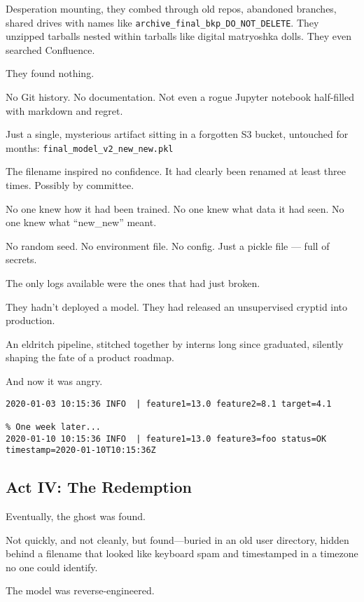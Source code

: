 Desperation mounting, they combed through old repos, abandoned branches, shared drives with names like \texttt{archive\_final\_bkp\_DO\_NOT\_DELETE}. They unzipped tarballs nested within tarballs like digital matryoshka dolls. They even searched Confluence.

They found nothing.

No Git history. No documentation. Not even a rogue Jupyter notebook half-filled with markdown and regret.

Just a single, mysterious artifact sitting in a forgotten S3 bucket, untouched for months:  
\texttt{final\_model\_v2\_new\_new.pkl}

The filename inspired no confidence. It had clearly been renamed at least three times. Possibly by committee.

No one knew how it had been trained.  
No one knew what data it had seen.  
No one knew what “new\_new” meant.

No random seed. No environment file. No config. Just a pickle file — full of secrets.

The only logs available were the ones that had just broken.

They hadn’t deployed a model.  
They had released an unsupervised cryptid into production.

An eldritch pipeline, stitched together by interns long since graduated, silently shaping the fate of a product roadmap.

And now it was angry.

\begin{lstlisting}[caption={The log that broke the build}, label={lst:falllogs}, basicstyle=\ttfamily\small, frame=single]
2020-01-03 10:15:36 INFO  | feature1=13.0 feature2=8.1 target=4.1

% One week later...
2020-01-10 10:15:36 INFO  | feature1=13.0 feature3=foo status=OK timestamp=2020-01-10T10:15:36Z
\end{lstlisting}

\subsection{Act IV: The Redemption}

Eventually, the ghost was found.

Not quickly, and not cleanly, but found---buried in an old user directory, hidden behind a filename that looked like keyboard spam and timestamped in a timezone no one could identify.

The model was reverse-engineered.

